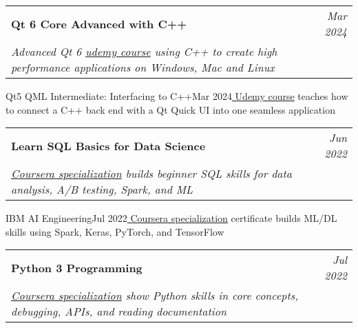 \documentclass[letterpaper,11pt]{article}
\makeatletter
\newcommand{\resumeOrganizationHeading}[4]{
  \vspace{-2pt}\item
    \begin{tabular*}{0.97\textwidth}[t]{l@{\extracolsep{\fill}}r}
      \textbf{#1} & \textit{\small #2} \\
      \textit{\small#3}
    \end{tabular*}\vspace{-7pt}
}
\newcommand{\resumeSubHeadingListEnd}{\end{itemize}}
\makeatother
\begin{document}
     \resumeOrganizationHeading
       {Qt 6 Core Advanced with C++}{Mar 2024}{Advanced Qt 6  \href{https://www.udemy.com/certificate/UC-6600f633-3b9f-4f2e-9dc9-75d3e2238920}{\color{blue} udemy course} using C++ to create high performance applications on Windows, Mac and Linux}
       
      \resumeOrganizationHeading
       {Qt5 QML Intermediate: Interfacing to C++}{Mar 2024}{\href{https://www.udemy.com/certificate/UC-3dd4a681-7d90-4d22-8707-b775778b501e}{\color{blue} Udemy course}  teaches how to connect a C++ back end with a Qt Quick UI into one seamless application}
       
       \resumeOrganizationHeading
       {Learn SQL Basics for Data Science}{Jun 2022}{\href{https://www.coursera.org/account/accomplishments/specialization/certificate/XFA24R3RU5NL}{\color{blue} Coursera specialization} builds beginner SQL skills for data analysis, A/B testing, Spark, and ML}
       
       \resumeOrganizationHeading
       {IBM AI Engineering}{Jul 2022}{\href{https://www.coursera.org/account/accomplishments/specialization/certificate/VV8JJ9MAFWTT}{\color{blue} Coursera specialization} certificate builds ML/DL skills using Spark, Keras, PyTorch, and TensorFlow}
       
       \resumeOrganizationHeading
       {Python 3 Programming}{Jul 2022}{\href{https://www.coursera.org/account/accomplishments/specialization/certificate/XQJ5MQX4X6ZX}{\color{blue} Coursera specialization} show Python skills in core concepts, debugging, APIs, and reading documentation}
    
  \resumeSubHeadingListEnd
\end{document}
